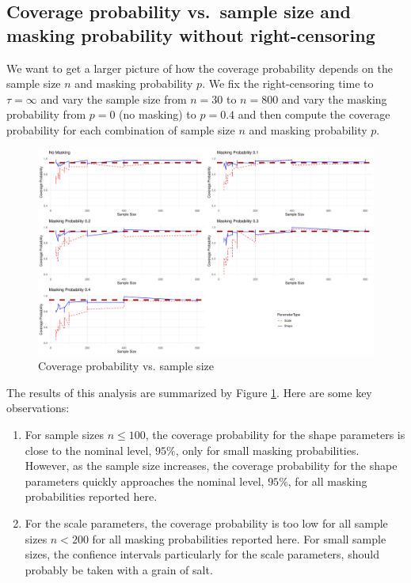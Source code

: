 \documentclass[
]{article}
\begin{document}
\hypertarget{coverage-probability-vs.-sample-size-and-masking-probability-without-right-censoring}{%
\subsection{Coverage probability vs.~sample size and masking probability
without
right-censoring}\label{coverage-probability-vs.-sample-size-and-masking-probability-without-right-censoring}}

We want to get a larger picture of how the coverage probability depends
on the sample size \(n\) and masking probability \(p\). We fix the
right-censoring time to \(\tau = \infty\) and vary the sample size from
\(n = 30\) to \(n = 800\) and vary the masking probability from
\(p = 0\) (no masking) to \(p = 0.4\) and then compute the coverage
probability for each combination of sample size \(n\) and masking
probability \(p\).

\begin{figure}

{\centering \includegraphics{image/plot-coverage-p-vs-sample-size} 

}

\caption{Coverage probability vs. sample size}\label{fig:plot-coverage-p-vs-sample-size}
\end{figure}

The results of this analysis are summarized by Figure
\ref{fig:plot-coverage-p-vs-sample-size}. Here are some key
observations:

\begin{enumerate}
\def\labelenumi{\arabic{enumi}.}
\item
  For sample sizes \(n \leq 100\), the coverage probability for the
  shape parameters is close to the nominal level, \(95\%\), only for
  small masking probabilities. However, as the sample size increases,
  the coverage probability for the shape parameters quickly approaches
  the nominal level, \(95\%\), for all masking probabilities reported
  here.
\item
  For the scale parameters, the coverage probability is too low for all
  sample sizes \(n < 200\) for all masking probabilities reported here.
  For small sample sizes, the confience intervals particularly for the
  scale parameters, should probably be taken with a grain of salt.
\end{enumerate}
\end{document}
